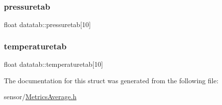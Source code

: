 \mbox{\label{structdatatab_ab8d11176f31a5fb8851108aa8547470c}} 
\subsubsection{\texorpdfstring{pressuretab}{pressuretab}}
{\footnotesize\ttfamily float datatab\+::pressuretab\mbox{[}10\mbox{]}}

\mbox{\label{structdatatab_aff78d9a5fd529111ab738f41bb6120c5}} 
\subsubsection{\texorpdfstring{temperaturetab}{temperaturetab}}
{\footnotesize\ttfamily float datatab\+::temperaturetab\mbox{[}10\mbox{]}}



The documentation for this struct was generated from the following file\+:\begin{DoxyCompactItemize}
\item 
sensor/\hyperlink{_metrics_average_8h}{Metrics\+Average.\+h}\end{DoxyCompactItemize}
